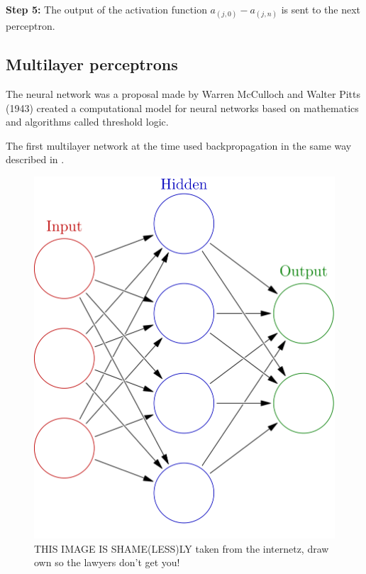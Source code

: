\textbf{Step 5:} The output of the activation function $a_{(j,0)}-a_{(j,n)}$ is sent to the next perceptron. 




\subsection{Multilayer perceptrons}
The neural network was a proposal made by Warren McCulloch and Walter Pitts (1943)   created a computational model for neural networks based on mathematics and algorithms called threshold logic. 

The first multilayer network at the time used backpropagation in the same way described in .

\begin{figure}[h]
\centering
\includegraphics[scale=0.2]{background/figures/neural_network.png}
\caption{THIS IMAGE IS SHAME(LESS)LY taken from the internetz, draw own so the lawyers don't get you!}
\label{fig:mlnn}
\end{figure}

